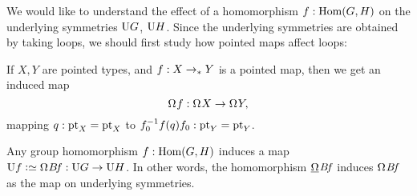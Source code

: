 We would like to understand the effect of a homomorphism $f : \Hom(G,H)$
on the underlying symmetries $\mathrm{U} G$, $\mathrm{U} H$.
Since the underlying symmetries are obtained by taking loops,
we should first study how pointed maps affect loops:
\begin{definition}
  If $X,Y$ are pointed types,
  and $f : X \to_\ast Y$ is a pointed map,
  then we get an induced map
  \[
    \loops f : \loops X \to \loops Y,
  \]
  mapping $q : \mathrm{pt}_X = \mathrm{pt}_X$
  to $f_0^{-1}f(q)f_0 : \mathrm{pt}_Y = \mathrm{pt}_Y$.
\end{definition}
\begin{definition}
  Any group homomorphism $f : \Hom(G,H)$
  induces a map $\USym f \defeq \loops B\!f : \USym G \to \USym H$.
  In other words, the homomorphism $\mkhom\Bf$
  induces $\loops\Bf$ as the map on underlying symmetries.
\end{definition}
